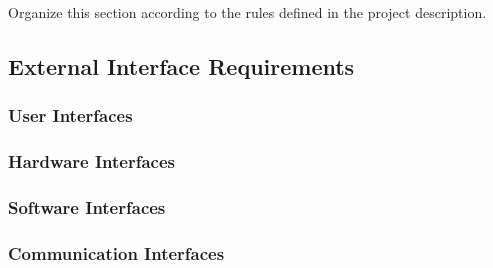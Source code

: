 Organize this section according to the rules defined in the project description. 
\subsection{External Interface Requirements}
\subsubsection{User Interfaces}
\subsubsection{Hardware Interfaces}
\subsubsection{Software Interfaces}
\subsubsection{Communication Interfaces}

